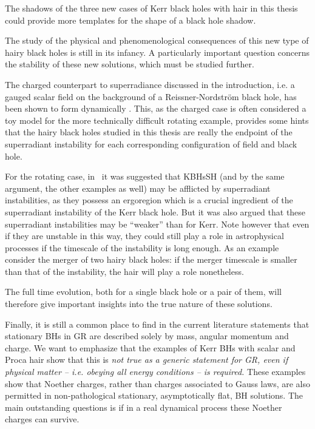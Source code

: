 The shadows of the three new cases of Kerr black holes with hair in this thesis could provide more templates for the shape of a black hole shadow.

\bigskip

The study of the physical and phenomenological consequences of this new type of hairy black holes is still in its infancy.
A particularly important question concerns the stability of these new solutions, which must be studied further.

The charged counterpart to superradiance discussed in the introduction, i.e. a gauged scalar field on the background of a Reissner-Nordström black hole, has been shown to form dynamically \cite{Sanchis-Gual:2015lje}.
This, as the charged case is often considered a toy model for the more technically difficult rotating example, provides some hints that the hairy black holes studied in this thesis are really the endpoint of the superradiant instability for each corresponding configuration of field and black hole.

For the rotating case, in~\cite{Herdeiro:2014jaa} it was suggested that KBHsSH (and by the same argument, the other examples as well) may be afflicted by superradiant instabilities, as they possess an ergoregion which is a crucial ingredient of the superradiant instability of the Kerr black hole.
But it was also argued that these superradiant instabilities may be ``weaker''  than for Kerr.
Note however that even if they are unstable in this way, they could still play a role in astrophysical processes if the timescale of the instability is long enough.
As an example consider the merger of two hairy black holes: if the merger timescale is smaller than that of the instability, the hair will play a role nonetheless.

The full time evolution, both for a single black hole or a pair of them, will therefore give important insights into the true nature of these solutions.


\bigskip

Finally, it is still a common place to find in the current literature statements that stationary BHs in GR are described solely by mass, angular momentum and charge.
We want to emphasize that the examples of Kerr BHs with scalar and Proca hair show that this is \textit{not true as a generic statement for GR, even if physical matter -- i.e. obeying all energy conditions -- is required.}
These examples show that Noether charges, rather than charges associated to Gauss laws, are also permitted in non-pathological stationary, asymptotically flat, BH solutions. 
The main outstanding questions is if in a real dynamical process these Noether charges can survive.

